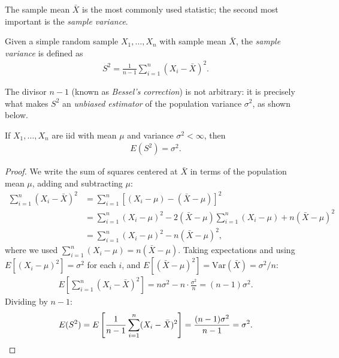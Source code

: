 The sample mean $\bar{X}$ is the most commonly used statistic; the second most important is the \emph{sample variance}.

\begin{definicion}
 \label{eq:5.1.1}
Given a simple random sample $X_1, \ldots, X_n$ with sample mean $\bar{X}$, the \emph{sample variance} is defined as
\begin{align}
 S^2 = \frac{1}{n-1}\sum_{i=1}^n (X_i - \bar{X})^2.
\end{align}
\end{definicion}

\begin{observacion}
The divisor $n-1$ (known as \emph{Bessel's correction}) is not arbitrary: it is precisely what makes $S^2$ an \emph{unbiased estimator} of the population variance $\sigma^2$, as shown below.
\end{observacion}

\begin{teorema}
 \label{eq:5.1.2}
If $X_1, \ldots, X_n$ are iid with mean $\mu$ and variance $\sigma^2 < \infty$, then
\begin{align}
 E(S^2) = \sigma^2.
\end{align}
\end{teorema}

\begin{proof}
We write the sum of squares centered at $\bar{X}$ in terms of the population mean $\mu$, adding and subtracting $\mu$:
\begin{align}
 \sum_{i=1}^n (X_i - \bar{X})^2
 &= \sum_{i=1}^n \left[(X_i - \mu) - (\bar{X} - \mu)\right]^2 \\
 &= \sum_{i=1}^n (X_i - \mu)^2 - 2(\bar{X}-\mu)\sum_{i=1}^n(X_i-\mu) + n(\bar{X}-\mu)^2 \\
 &= \sum_{i=1}^n (X_i - \mu)^2 - n(\bar{X}-\mu)^2,
\end{align}
where we used $\sum_{i=1}^n (X_i - \mu) = n(\bar{X}-\mu)$. Taking expectations and using $E[(X_i-\mu)^2] = \sigma^2$ for each $i$, and $E[(\bar{X}-\mu)^2] = \text{Var}(\bar{X}) = \sigma^2/n$:
\begin{align}
 E\left[\sum_{i=1}^n (X_i - \bar{X})^2\right] = n\sigma^2 - n\cdot\frac{\sigma^2}{n}
 = (n-1)\sigma^2.
\end{align}
Dividing by $n-1$:
\begin{align}
 E(S^2) = E\left[\frac{1}{n-1}\sum_{i=1}^n (X_i - \bar{X})^2\right]
 = \frac{(n-1)\sigma^2}{n-1} = \sigma^2. \qedhere
\end{align}
\end{proof}

